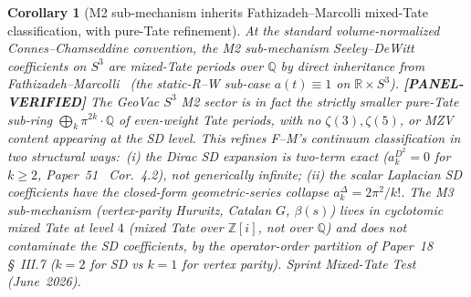 \documentclass[11pt]{article}
\providecommand{\sthree}{S^3}
\newtheorem{corollary}{Corollary}
\begin{document}
\begin{corollary}[M2 sub-mechanism inherits Fathizadeh--Marcolli
mixed-Tate classification, with pure-Tate refinement]
\label{cor:m2_mixed_tate}
At the standard volume-normalized Connes--Chamseddine
convention, the M2 sub-mechanism Seeley--DeWitt coefficients on
$\sthree$ are mixed-Tate periods over $\mathbb{Q}$ by direct
inheritance from
Fathizadeh--Marcolli~\cite{fathizadeh_marcolli2016} (the static-R--W
sub-case $a(t) \equiv 1$ on $\mathbb{R} \times \sthree$). \textbf{[PANEL-VERIFIED]} The GeoVac
$\sthree$ M2 sector is in fact the strictly smaller pure-Tate
sub-ring
$\bigoplus_k \pi^{2k}\cdot\mathbb{Q}$
of even-weight Tate periods, with no $\zeta(3), \zeta(5)$, or MZV
content appearing at the SD level. This refines F--M's continuum
classification in two structural ways:\ (i) the Dirac SD expansion
is two-term exact ($a_k^{D^2} = 0$ for $k \ge 2$,
Paper~51~\cite{paper51} Cor.~4.2), not generically infinite; (ii)
the scalar Laplacian SD coefficients have the closed-form
geometric-series collapse $a_k^\Delta = 2\pi^2/k!$. The M3
sub-mechanism (vertex-parity Hurwitz, Catalan $G$, $\beta(s)$)
lives in cyclotomic mixed Tate at level $4$ (mixed Tate over
$\mathbb{Z}[i]$, not over $\mathbb{Q}$) and does \emph{not}
contaminate the SD coefficients, by the operator-order partition
of Paper~18~\cite{paper18} \S~III.7 ($k=2$ for SD vs $k=1$ for
vertex parity). Sprint Mixed-Tate Test (June~2026).
\end{corollary}
\end{document}
